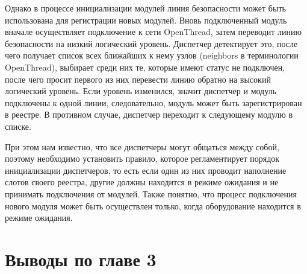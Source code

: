Однако в процессе инициализации модулей линия безопасности может быть использована для регистрации новых модулей. Вновь подключенный модуль вначале осуществляет подключение к сети OpenThread, затем переводит линию безопасности на низкий логический уровень. Диспетчер детектирует это, после чего получает список всех ближайших к нему узлов (neighbors в терминологии OpenThread), выбирает среди них те, которые имеют статус не подключен, после чего просит первого из них перевести линию обратно на высокий логический уровень. Если уровень изменился, значит диспетчер и модуль подключены к одной линии, следовательно, модуль может быть зарегистрирован в реестре. В противном случае, диспетчер переходит к следующему модулю в списке.

При этом нам известно, что все диспетчеры могут общаться между собой, поэтому необходимо установить правило, которое регламентирует порядок инициализации диспетчеров, то есть если один из них проводит наполнение слотов своего реестра, другие должны находится в режиме ожидания и не принимать подключения от модулей. Также понятно, что процесс подключения нового модуля может быть осуществлен только, когда оборудование находится в режиме ожидания.

\section{Выводы по главе 3}

\FloatBarrier